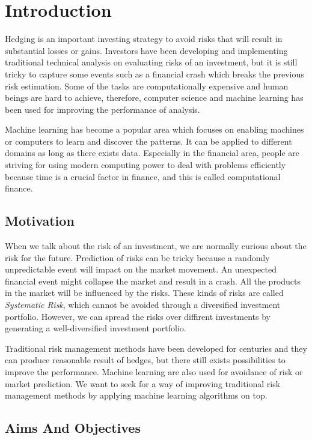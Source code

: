 \documentclass[11pt]{article} %
\theoremstyle{plain}
\theoremstyle{definition}
\begin{document}
\clearpage

\section{Introduction}

Hedging is an important investing strategy to avoid risks that will result in substantial losses or gains. Investors have been developing and implementing traditional technical analysis on evaluating risks of an investment, but it is still tricky to capture some events such as a financial crash which breaks the previous risk estimation. Some of the tasks are computationally expensive and human beings are hard to achieve, therefore, computer science and machine learning has been used for improving the performance of analysis.

Machine learning has become a popular area which focuses on enabling machines or computers to learn and discover the patterns. It can be applied to different domains as long as there exists data. Especially in the financial area, people are striving for using modern computing power to deal with problems efficiently because time is a crucial factor in finance, and this is called computational finance.

\subsection{Motivation}

When we talk about the risk of an investment, we are normally curious about the risk for the future. Prediction of risks can be tricky because a randomly unpredictable event will impact on the market movement. An unexpected financial event might collapse the market and result in a crash. All the products in the market will be influenced by the risks. These kinds of risks are called \textsl{Systematic Risk}, which cannot be avoided through a diversified investment portfolio. However, we can spread the risks over diffirent investments by generating a well-diversified investment portfolio.

Traditional risk management methods have been developed for centuries and they can produce reasonable result of hedges, but there still exists possibilities to improve the performance. Machine learning are also used for avoidance of risk or market prediction. We want to seek for a way of improving traditional risk management methods by applying machine learning algorithms on top.

\subsection{Aims And Objectives}
\end{document}

